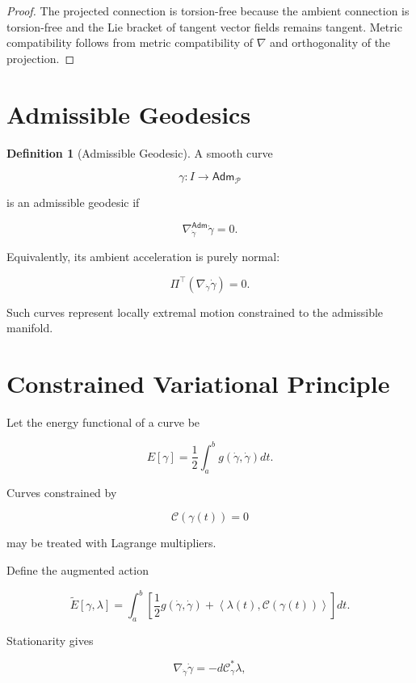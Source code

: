 \documentclass[11pt,oneside]{book}
\numberwithin{equation}{chapter}
\theoremstyle{definition}
\newtheorem{definition}{Definition}[chapter]
\theoremstyle{plain}
\newcommand{\Adm}{\mathsf{Adm}}
\begin{document}
\begin{proof}

The projected connection is torsion-free because the ambient connection is
torsion-free and the Lie bracket of tangent vector fields remains tangent.
Metric compatibility follows from metric compatibility of \(\nabla\) and
orthogonality of the projection.

\end{proof}

\section{Admissible Geodesics}

\begin{definition}[Admissible Geodesic]

A smooth curve

\[
\gamma:I\longrightarrow\Adm_{\mathcal P}
\]

is an admissible geodesic if

\[
\nabla^{\Adm}_{\dot\gamma}
\dot\gamma
=
0.
\]

\end{definition}

Equivalently, its ambient acceleration is purely normal:

\[
\Pi^{\top}
\left(
\nabla_{\dot\gamma}\dot\gamma
\right)
=
0.
\]

Such curves represent locally extremal motion constrained to the admissible
manifold.

\section{Constrained Variational Principle}

Let the energy functional of a curve be

\[
E[\gamma]
=
\frac12
\int_a^b
g
\left(
\dot\gamma,
\dot\gamma
\right)
dt.
\]

Curves constrained by

\[
\mathcal C(\gamma(t))=0
\]

may be treated with Lagrange multipliers.

Define the augmented action

\[
\widetilde E[\gamma,\lambda]
=
\int_a^b
\left[
\frac12
g
\left(
\dot\gamma,
\dot\gamma
\right)
+
\left\langle
\lambda(t),
\mathcal C(\gamma(t))
\right\rangle
\right]
dt.
\]

Stationarity gives

\[
\nabla_{\dot\gamma}\dot\gamma
=
-
d\mathcal C_{\gamma}^{*}\lambda,
\]
\end{document}
